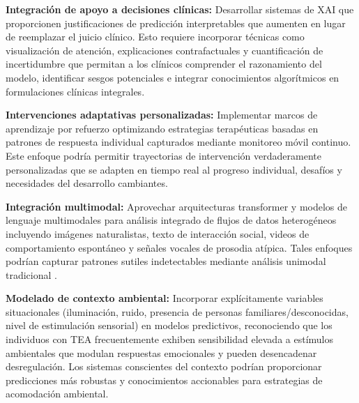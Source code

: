 \documentclass{ieeeaccess}
\begin{document}
	\textbf{Integración de apoyo a decisiones clínicas:} Desarrollar sistemas de XAI que proporcionen justificaciones de predicción interpretables que aumenten en lugar de reemplazar el juicio clínico. Esto requiere incorporar técnicas como visualización de atención, explicaciones contrafactuales y cuantificación de incertidumbre que permitan a los clínicos comprender el razonamiento del modelo, identificar sesgos potenciales e integrar conocimientos algorítmicos en formulaciones clínicas integrales.
	
	\textbf{Intervenciones adaptativas personalizadas:} Implementar marcos de aprendizaje por refuerzo optimizando estrategias terapéuticas basadas en patrones de respuesta individual capturados mediante monitoreo móvil continuo. Este enfoque podría permitir trayectorias de intervención verdaderamente personalizadas que se adapten en tiempo real al progreso individual, desafíos y necesidades del desarrollo cambiantes.
	
	\textbf{Integración multimodal:} Aprovechar arquitecturas transformer y modelos de lenguaje multimodales para análisis integrado de flujos de datos heterogéneos incluyendo imágenes naturalistas, texto de interacción social, videos de comportamiento espontáneo y señales vocales de prosodia atípica. Tales enfoques podrían capturar patrones sutiles indetectables mediante análisis unimodal tradicional \cite{b18}.
	
	\textbf{Modelado de contexto ambiental:} Incorporar explícitamente variables situacionales (iluminación, ruido, presencia de personas familiares/desconocidas, nivel de estimulación sensorial) en modelos predictivos, reconociendo que los individuos con TEA frecuentemente exhiben sensibilidad elevada a estímulos ambientales que modulan respuestas emocionales y pueden desencadenar desregulación. Los sistemas conscientes del contexto podrían proporcionar predicciones más robustas y conocimientos accionables para estrategias de acomodación ambiental.
	
\end{document}
